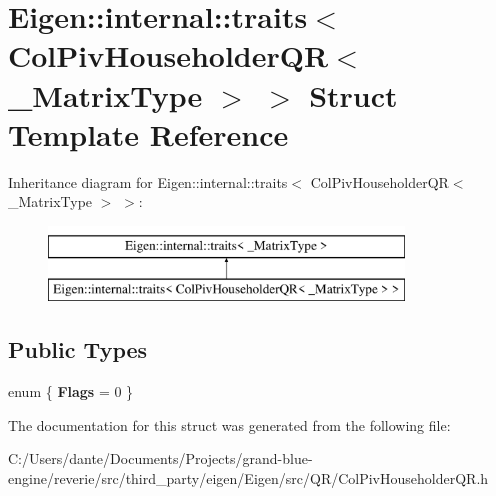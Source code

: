 \hypertarget{struct_eigen_1_1internal_1_1traits_3_01_col_piv_householder_q_r_3_01___matrix_type_01_4_01_4}{}\section{Eigen\+::internal\+::traits$<$ Col\+Piv\+Householder\+QR$<$ \+\_\+\+Matrix\+Type $>$ $>$ Struct Template Reference}
\label{struct_eigen_1_1internal_1_1traits_3_01_col_piv_householder_q_r_3_01___matrix_type_01_4_01_4}
Inheritance diagram for Eigen\+::internal\+::traits$<$ Col\+Piv\+Householder\+QR$<$ \+\_\+\+Matrix\+Type $>$ $>$\+:\begin{figure}[H]
\begin{center}
\leavevmode
\includegraphics[height=2.000000cm]{struct_eigen_1_1internal_1_1traits_3_01_col_piv_householder_q_r_3_01___matrix_type_01_4_01_4}
\end{center}
\end{figure}
\subsection*{Public Types}
\begin{DoxyCompactItemize}
\item 
\mbox{\label{struct_eigen_1_1internal_1_1traits_3_01_col_piv_householder_q_r_3_01___matrix_type_01_4_01_4_a43689be180b0d913e5d24cdb3dda8e6f}} 
enum \{ {\bfseries Flags} = 0
 \}
\end{DoxyCompactItemize}


The documentation for this struct was generated from the following file\+:\begin{DoxyCompactItemize}
\item 
C\+:/\+Users/dante/\+Documents/\+Projects/grand-\/blue-\/engine/reverie/src/third\+\_\+party/eigen/\+Eigen/src/\+Q\+R/Col\+Piv\+Householder\+Q\+R.\+h\end{DoxyCompactItemize}
